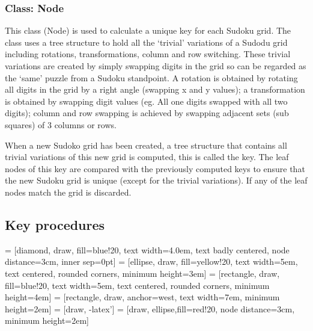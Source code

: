 \documentclass[fleqn]{article}
\begin{document}
\subsubsection{Class: Node}
This class (Node) is used to calculate a unique key for each Sudoku grid. The class uses a tree structure to hold all the ‘trivial’ variations of a Sudodu grid including rotations, transformations, column and row switching. These trivial variations are created by simply swapping digits in the grid so can be regarded as the ‘same’ puzzle from a Sudoku standpoint. A rotation is obtained by rotating all digits in the grid by a right angle (swapping x and y values); a transformation is obtained by swapping digit values (eg. All one digits swapped with all two digits); column and row swapping is achieved by swapping adjacent sets (sub squares) of 3 columns or rows.

When a new Sudoko grid has been created, a tree structure that contains all trivial variations of this new grid is computed, this is called the key. The leaf nodes of this key are compared with the previously computed keys to ensure that the new Sudoku grid is unique (except for the trivial variations). If any of the leaf nodes match the grid is discarded.


\subsection{Key procedures}

 = [diamond, draw, fill=blue!20, 
    text width=4.0em, text badly centered, node distance=3cm, inner sep=0pt]
 = [ellipse, draw, fill=yellow!20, 
    text width=5em, text centered, rounded corners, minimum height=3em]
 = [rectangle, draw, fill=blue!20, 
    text width=5em, text centered, rounded corners, minimum height=4em]
 = [rectangle, draw, anchor=west,
    text width=7em, minimum height=2em]
 = [draw, -latex']
 = [draw, ellipse,fill=red!20, node distance=3cm,
    minimum height=2em]
    
\end{document}
